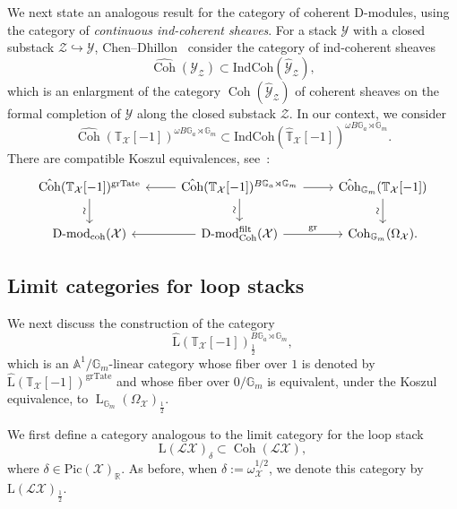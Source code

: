 \documentclass [11pt,oneside,a4paper,mathscr]{amsart}
\theoremstyle{definition}
\newcommand{\Y}{\mathcal{Y}}
\newcommand{\LL}{\operatorname{L}}
\newcommand{\X}{\mathcal{X}}
\newcommand{\Coh}{\operatorname{Coh}}
\begin{document}
We next state an analogous result for the category of coherent D-modules, using the category of \textit{continuous ind-coherent sheaves}. For a stack $\mathcal{Y}$ with a closed substack $\mathcal{Z}\hookrightarrow \mathcal{Y}$, Chen--Dhillon~\cite{ChenDhillon} consider
the category of ind-coherent sheaves \[\hat{\Coh}(\Y_\mathscr{Z})\subset \text{IndCoh}(\hat{\Y}_\mathscr{Z}),\] which  is an enlargment of the category $\Coh(\hat{\Y}_\mathscr{Z})$ of coherent sheaves on the formal completion of $\Y$ along the closed substack $\mathscr{Z}$. In our context, we consider
\[\hat{\Coh}(\mathbb{T}_\X[-1])^{\omega B\mathbb{G}_a\rtimes\mathbb{G}_m}\subset  \text{IndCoh}(\hat{\mathbb{T}}_\X[-1])^{\omega B\mathbb{G}_a\rtimes\mathbb{G}_m}.\]
There are compatible Koszul equivalences, see~\cite[Theorem A]{HChen}:
\begin{equation*}
    \begin{tikzcd}
        \hat{\Coh}(\mathbb{T}_\X[-1])^{\text{grTate}} 
        \arrow[d, "\sim" {anchor=south, rotate=90}]& 
        \hat{\Coh}(\mathbb{T}_\X[-1])^{ B\mathbb{G}_a\rtimes\mathbb{G}_m} 
        \arrow[r]\arrow[l]\arrow[d, "\sim" {anchor=south, rotate=90}]& 
        \hat{\Coh}_{\mathbb{G}_m}(\mathbb{T}_\X[-1]) \arrow[d, "\sim" {anchor=south, rotate=90}]\\
        \text{D-mod}_{\mathrm{coh}}(\X)& 
        \text{D-mod}^{\text{filt}}_{\Coh}(\X) \arrow[r, "\text{gr}"]\arrow[l]& \Coh_{\mathbb{G}_m}(\Omega_{\X}).
    \end{tikzcd}
\end{equation*}





\subsection{Limit categories for loop stacks}

We next discuss the construction of the category 
\begin{equation}\label{def:Lhat}
\hat{\text{L}}(\mathbb{T}_{\X}[-1])^{B\mathbb{G}_a\rtimes\mathbb{G}_m}_{\frac{1}{2}},
\end{equation} which is an $\mathbb{A}^1/\mathbb{G}_m$-linear category whose fiber over $1$ is denoted by $\hat{\text{L}}(\mathbb{T}_{\X}[-1])^{\text{grTate}}$ and whose fiber over $0/\mathbb{G}_m$ is equivalent, under the Koszul equivalence, to $\LL_{\mathbb{G}_m}(\Omega_\X)_{\frac{1}{2}}$.


We first define a category analogous to the limit category for the loop stack
\[\text{L}(\mathscr{L}\X)_\delta\subset \Coh(\mathscr{L}\X),\]
where $\delta\in\text{Pic}(\X)_\mathbb{R}$. As before, when $\delta:=\omega_{\X}^{1/2}$, we denote this category by $\text{L}(\mathscr{L}\X)_{\frac{1}{2}}$. 
\end{document}
